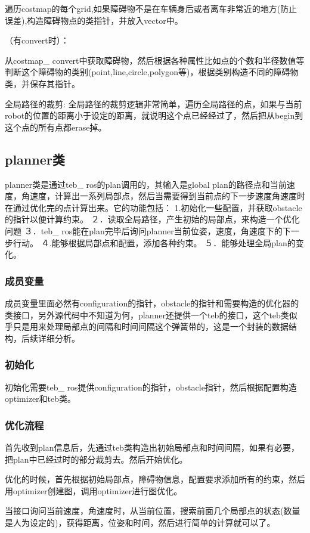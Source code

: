 \documentclass[10pt,a4paper]{article}
\theoremstyle{mythm}
\numberwithin{equation}{section}
\begin{document}
遍历costmap的每个grid,如果障碍物不是在车辆身后或者离车非常近的地方(防止误差),构造障碍物点的类指针，并放入vector中。

（有convert时）：

从costmap\_ convert中获取障碍物，然后根据各种属性比如点的个数和半径数值等判断这个障碍物的类别(point,line,circle,polygon等)，根据类别构造不同的障碍物类，并保存其指针。

全局路径的裁剪:
全局路径的裁剪逻辑非常简单，遍历全局路径的点，如果与当前robot的位置的距离小于设定的距离，就说明这个点已经经过了，然后把从begin到这个点的所有点都erase掉。
\subsection{planner类}
planner类是通过teb\_ ros的plan调用的，其输入是global plan的路径点和当前速度，角速度，计算出一系列局部点，然后当需要得到当前点的下一步速度角速度时在通过优化完的点计算出来。它的功能包括：
1.初始化一些配置，并获取obstacle的指针以便计算约束。
２．读取全局路径，产生初始的局部点，来构造一个优化问题
３．teb\_ ros能在plan完毕后询问planner当前位姿，速度，角速度下的下一步行动。
４.能够根据局部点和配置，添加各种约束。
５．能够处理全局plan的变化。

\subsubsection{成员变量}
成员变量里面必然有configuration的指针，obstacle的指针和需要构造的优化器的类接口，另外源代码中不知道为何，planner还提供一个teb的接口，这个teb类似乎只是用来处理局部点的间隔和时间间隔这个弹簧带的，这是一个封装的数据结构，后续详细分析。
\subsubsection{初始化}
初始化需要teb\_ ros提供configuration的指针，obstacle指针，然后根据配置构造optimizer和teb类。

\subsubsection{优化流程}
首先收到plan信息后，先通过teb类构造出初始局部点和时间间隔，如果有必要，把plan中已经过时的部分裁剪去。然后开始优化。

优化的时候，首先根据初始局部点，障碍物信息，配置要求添加所有的约束，然后用optimizer创建图，调用optimizer进行图优化。

当接口询问当前速度，角速度时，从当前位置，搜索前面几个局部点的状态(数量是人为设定的)，获得距离，位姿和时间，然后进行简单的计算就可以了。
\end{document}
